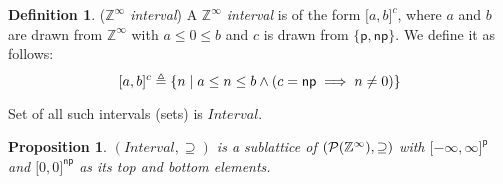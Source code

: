\documentclass{article}
\theoremstyle{definition}
\newtheorem{defn}{Definition}
\theoremstyle{plain}
\newtheorem{prop}{Proposition}
\newcommand{\zinf}{\textnormal{$\mathbb{Z}^\infty$}}
\newcommand{\interv}[3]{\textnormal{$\lbrack#1,#2\rbrack^{#3}$}}
\begin{document}
\begin{defn}{(\emph{\zinf{} interval})}
  A \emph{\zinf{} interval} is of the form \interv{a}{b}{c}, where $a$ and $b$
  are drawn from \zinf{} with $a \leq 0 \leq b$ and $c$ is drawn from $\{
  \textsf{p}, \textsf{np} \}$. We define it as follows:
%
  \begin{equation*}
    \interv{a}{b}{c} \triangleq
      \{ n \;|\; a \leq n \leq b \wedge (c = \textsf{np} \implies n \neq 0) \}
  \end{equation*}

  Set of all such intervals (sets) is $\textit{Interval}$.
\end{defn}

\begin{prop}{}
  $(\textit{Interval}, \supseteq)$ is a sublattice of
  $(\mathcal{P}(\zinf{}),\supseteq)$ with \interv{-\infty}{\infty}{\textsf{p}}
  and \interv{0}{0}{\textsf{np}} as its top and bottom elements.
\end{prop}
%
\end{document}
